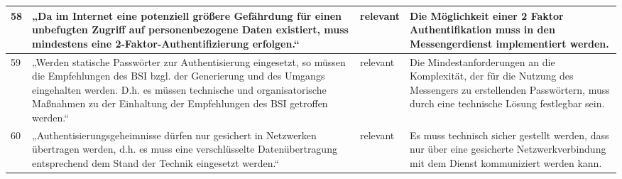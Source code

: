 \begin{longtable}{p{0.6cm}|p{6cm}|p{2cm}|p{6cm}}
    58     & „Da im Internet eine potenziell größere Gefährdung für einen unbefugten Zugriff auf personenbezogene Daten existiert, muss mindestens eine 2-Faktor-Authentifizierung erfolgen.“                                                                                                                     & relevant           & Die Möglichkeit einer 2 Faktor Authentifikation muss in den Messengerdienst implementiert werden.                                                                                                                                                                                                                                                                                                                                                                                                                                                                  \\ \hline
    59     & „Werden statische Passwörter zur Authentisierung eingesetzt, so müssen die Empfehlungen des BSI bzgl. der Generierung und des Umgangs eingehalten werden. D.h. es müssen technische und organisatorische Maßnahmen zu der Einhaltung der Empfehlungen des BSI getroffen werden.“                     & relevant           & Die Mindestanforderungen an die Komplexität, der für die Nutzung des Messengers zu erstellenden Passwörtern, muss durch eine technische Lösung festlegbar sein.                                                                                                                                                                                                                                                                                                                                                                                                       \\ \hline
    60     & „Authentisierungsgeheimnisse dürfen nur gesichert in Netzwerken übertragen werden, d.h. es muss eine verschlüsselte Datenübertragung entsprechend dem Stand der Technik eingesetzt werden.“                                                                                                          & relevant           & Es muss technisch sicher gestellt werden, dass nur über eine gesicherte Netzwerkverbindung mit dem Dienst kommuniziert werden kann.                                                                                                                                                                                                                                                                                                                                                                                                                                 \\ \hline

\end{longtable}

